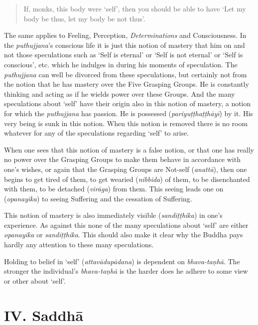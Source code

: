\begin{quote}
If, monks, this body were `self', then you should be able to have `Let my body be thus, let my body be not thus'.
\end{quote}

The same applies to Feeling, Perception, \emph{Determinations} and Consciousness. In the \emph{puthujjana}'s conscious life it is just this notion of mastery that  him on and not those speculations such as `Self is eternal' or `Self is not eternal' or `Self is conscious', etc. which he indulges in during his moments of speculation. The \emph{puthujjana} can well be divorced from these speculations, but certainly not from the notion that he has mastery over the Five Grasping Groups. He is constantly thinking and acting as if he wields power over these Groups. And the many speculations about `self' have their origin also in this notion of mastery, a notion for which the \emph{puthujjana} has passion. He is possessed (\emph{pariyuṭṭhaṭṭhāyī}) by it. His very being is sunk in this notion. When this notion is removed there is no room whatever for any of the speculations regarding `self' to arise.

When one sees that this notion of mastery is a false notion, or that one has really no power over the Grasping Groups to make them behave in accordance with one's wishes, or again that the Grasping Groups are Not-self (\emph{anattā}), then one begins to get tired of them, to get wearied (\emph{nibbida}) of them, to be disenchanted with them, to be detached (\emph{virāga}) from them. This seeing leads one on (\emph{opanayika}) to seeing Suffering and the cessation of Suffering.

This notion of mastery is also immediately visible (\emph{sandiṭṭhika}) in one's experience. As against this none of the many speculations about `self' are either \emph{opanayika} or \emph{sandiṭṭhika}. This should also make it clear why the Buddha pays hardly any attention to these many speculations.

Holding to belief in `self' (\emph{attavādupādana}) is dependent on \emph{bhava-taṇhā}. The stronger the individual's \emph{bhava-taṇhā} is the harder does he adhere to some view or other about `self'.

\hypertarget{_iv_saddhux101}{%
\section{IV. Saddhā}\label{_iv_saddhux101}}

